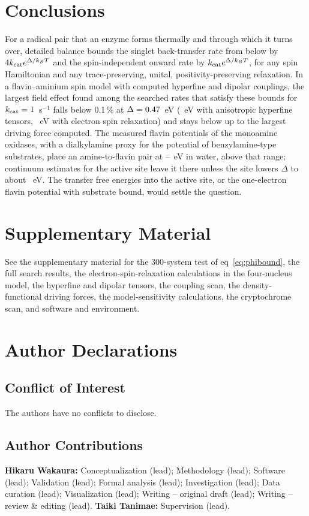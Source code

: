\documentclass[aip,jcp,amsmath,amssymb,reprint]{revtex4-1}
\begin{document}
\section{Conclusions}

For a radical pair that an enzyme forms thermally and through which it turns
over, detailed balance bounds the singlet back-transfer rate from below by
$4k_{\rm cat}e^{\Delta/k_BT}$ and the spin-independent onward rate by
$k_{\rm cat}e^{\Delta/k_BT}$, for any spin Hamiltonian and any trace-preserving,
unital, positivity-preserving relaxation. In a flavin--aminium spin model with
computed hyperfine and dipolar couplings, the largest field effect found among
the searched rates that satisfy these bounds for $k_{\rm cat}=1$~s$^{-1}$ falls
below 0.1\,\% at $\Delta=0.47$~eV (\ThrTenthOneAniso~eV with anisotropic
hyperfine tensors, \ThrTenthOneRelax~eV with electron spin relaxation) and stays
below up to the largest driving force computed. The measured flavin potentials
of the monoamine oxidases, with a dialkylamine proxy for the potential of
benzylamine-type substrates, place an amine-to-flavin pair at
\DeltaMAOsubLo--\DeltaMAOhi~eV in water, above that range; continuum estimates
for the active site leave it there unless the site lowers $\Delta$ to about
\DeltaSiteLo~eV. The transfer free energies into the active site, or the
one-electron flavin potential with substrate bound, would settle the question.

\section*{Supplementary Material}
See the supplementary material for the 300-system test of
eq~\ref{eq:phibound}, the full search results, the electron-spin-relaxation
calculations in the four-nucleus model, the hyperfine and dipolar tensors, the
coupling scan, the density-functional driving forces, the model-sensitivity
calculations, the cryptochrome scan, and software and environment.

\section*{Author Declarations}
\subsection*{Conflict of Interest}
The authors have no conflicts to disclose.
\subsection*{Author Contributions}
\textbf{Hikaru Wakaura:} Conceptualization (lead); Methodology (lead); Software
(lead); Validation (lead); Formal analysis (lead); Investigation (lead); Data
curation (lead); Visualization (lead); Writing -- original draft (lead);
Writing -- review \& editing (lead). \textbf{Taiki Tanimae:} Supervision
(lead).
\end{document}
